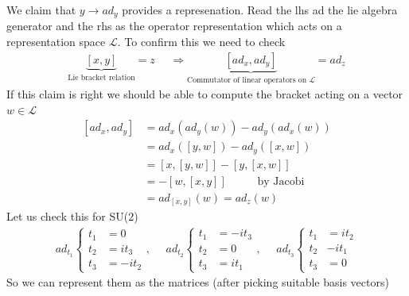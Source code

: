 \documentclass[a4paper,12pt]{article}
\begin{document}
We claim that $y\to ad_y$ provides a represenation. Read the lhs ad the lie algebra generator and the rhs as the operator representation which acts on a representation space $\mathcal{L}$. To confirm this we need to check
\begin{equation}
	\begin{aligned}
		\underbrace{\left[x,y\right]}_{\text{Lie bracket relation}}=z~~~~~~ \Rightarrow \underbrace{\left[ad_x,ad_y\right]}_{\text{Commutator of linear operators on } \mathcal{L}}=ad_z
	\end{aligned}
\end{equation}
If this claim is right we should be able to compute the bracket acting on a vector $w\in \mathcal{L}$
\begin{equation}
	\begin{aligned}
		\left[ad_x,ad_y\right]&=ad_x(ad_y(w))-ad_y(ad_x(w))\\
		&=ad_x(\left[y,w\right])-ad_y(\left[x,w\right])\\
		&=\left[x,\left[y,w\right]\right]-\left[y,\left[x,w\right]\right]\\
		&=-\left[w,\left[x,y\right]\right]~~~~~~~~~~~\text{ by Jacobi}\\
		&=ad_{[x,y]}(w)=ad_z(w)
	\end{aligned}
\end{equation}
Let us check this for SU(2)
\begin{equation}
	\begin{aligned}
		ad_{t_1}\begin{cases}
			t_1&=0\\
			t_2&=it_3\\
			t_3&=-it_2
		\end{cases},~~~~~~		ad_{t_2}\begin{cases}
		t_1&=-it_3\\
		t_2&=0\\
		t_3&=it_1
	\end{cases},~~~~~~		ad_{t_3}\begin{cases}
	t_1&=it_2\\
	t_2&-it_1\\
	t_3&=0
\end{cases}
	\end{aligned}
\end{equation}
So we can represent them as the matrices (after picking suitable basis vectors)
\end{document}
